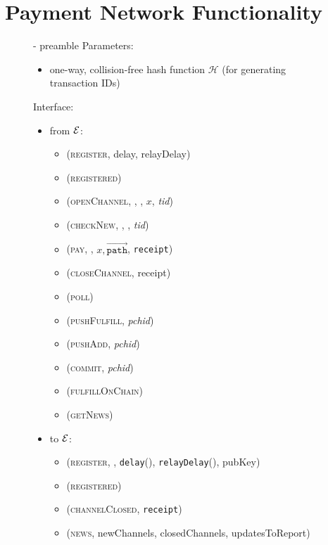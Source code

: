 \section{Payment Network Functionality}
  \begin{figure}[H]
    \begin{systembox}{\fpaynet - preamble}
      Parameters:
        \begin{itemize}
          \item one-way, collision-free hash function $\mathcal{H}$ (for
          generating transaction IDs)
        \end{itemize}

      Interface: 
      \begin{itemize}
        \item from $\mathcal{E}$:
        \begin{itemize}
          \item (\textsc{register}, delay, relayDelay)
          \item (\textsc{registered})
          \item (\textsc{openChannel}, \alice, \bob, $x$, \textit{tid})
          \item (\textsc{checkNew}, \alice, \bob, \textit{tid})
          \item (\textsc{pay}, \bob, $x, \overrightarrow{\mathtt{path}}$,
          \texttt{receipt})
          \item (\textsc{closeChannel}, receipt)
          \item (\textsc{poll})
          \item (\textsc{pushFulfill}, \textit{pchid})
          \item (\textsc{pushAdd}, \textit{pchid})
          \item (\textsc{commit}, \textit{pchid})
          \item (\textsc{fulfillOnChain})
          \item (\textsc{getNews})
        \end{itemize}
        \item to $\mathcal{E}$:
        \begin{itemize}
          \item (\textsc{register}, \alice, \texttt{delay}(\alice),
          \texttt{relayDelay}(\alice), pubKey)
          \item (\textsc{registered})
          \item (\textsc{channelClosed}, \texttt{receipt})
          \item (\textsc{news}, newChannels, closedChannels, updatesToReport)

\end{itemize}
\end{itemize}
\end{systembox}
\end{figure}
